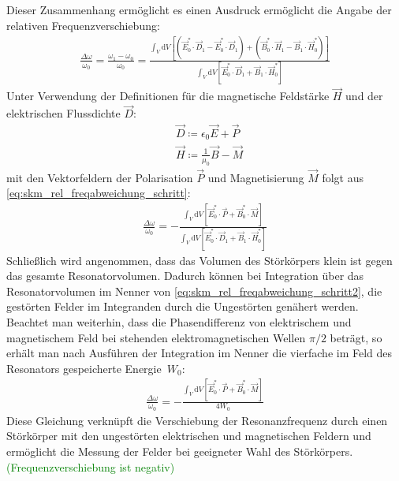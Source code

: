 \documentclass[11pt, a4paper]{scrbook}
\newcommand{\ve}{\vec{E}}
\newcommand{\vb}{\vec{B}}
\newcommand{\vh}{\vec{H}}
\newcommand{\vd}{\vec{D}}
\newcommand{\todo}[1]{{\textcolor{Green}{(#1)}}}
\begin{document}
	Dieser Zusammenhang ermöglicht es einen Ausdruck ermöglicht die Angabe der relativen Frequenzverschiebung:
	\begin{align}
		\frac{\Delta \omega}{\omega_0}= \frac{\omega_1 - \omega_0}{\omega_0} = \frac{\int_{V} \mathrm{d}V \left[ \left( \ve_0^* \cdot \vd_1 - \ve_0^* \cdot \vd_1 \right) + \left( \vb_0^* \cdot \vh_1 - \vb_1 \cdot \vh_0^* \right)\right]}{\int_V \mathrm{d}V \left[\ve_0^* \cdot \vd_1 + \vb_1 \cdot \vh_0^* \right] }
		\label{eq:skm_rel_freqabweichung_schritt}
	\end{align}
	Unter Verwendung der Definitionen für die magnetische Feldstärke $\vh$ und der elektrischen Flussdichte $\vd$:
	\begin{subequations}
		\begin{align}
			&\vd \coloneqq \epsilon_0 \ve + \vec{P}\\
			&\vh \coloneqq \frac{1}{\mu_0} \vb - \vec{M}
		\end{align}
	\end{subequations}
	mit den Vektorfeldern der Polarisation $\vec{P}$ und Magnetisierung $\vec{M}$ folgt aus \eqref{eq:skm_rel_freqabweichung_schritt}:
	\begin{align}
		\frac{\Delta \omega}{\omega_0} = - \frac{\int_V \mathrm{d}V \left[ \ve_0^* \cdot \vec{P} + \vb_0^* \cdot \vec{M} \right]}{\int_V \mathrm{d}V \left[ \ve_0^* \cdot \vd_1 + \vb_1 \cdot \vh_0^* \right]} \label{eq:skm_rel_freqabweichung_schritt2}
	\end{align}
	Schließlich wird angenommen, dass das Volumen des Störkörpers klein ist gegen das gesamte Resonatorvolumen.
	Dadurch können bei Integration über das Resonatorvolumen im Nenner von \eqref{eq:skm_rel_freqabweichung_schritt2}, die gestörten Felder im Integranden durch die Ungestörten genähert werden.
	Beachtet man weiterhin, dass die Phasendifferenz von elektrischem und magnetischem Feld bei stehenden elektromagnetischen Wellen $\pi / 2$ beträgt, so erhält man nach Ausführen der Integration im Nenner die vierfache im Feld des Resonators gespeicherte Energie~$W_0$:
	\begin{align}
		\frac{\Delta \omega}{\omega_0} = - \frac{\int_V \mathrm{d}V \left[ \ve_0^* \cdot \vec{P} + \vb_0^* \cdot \vec{M} \right]}{4 W_0}
	\end{align}
	Diese Gleichung verknüpft die Verschiebung der Resonanzfrequenz durch einen Störkörper mit den ungestörten elektrischen und magnetischen Feldern und ermöglicht die Messung der Felder bei geeigneter Wahl des Störkörpers.
	\todo{Frequenzverschiebung ist negativ}
		
\end{document}

